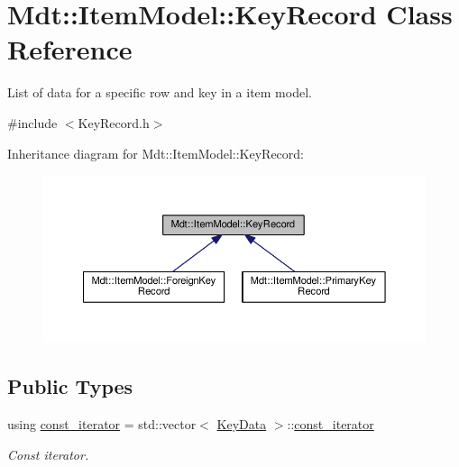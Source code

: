\hypertarget{class_mdt_1_1_item_model_1_1_key_record}{}\section{Mdt\+:\+:Item\+Model\+:\+:Key\+Record Class Reference}
\label{class_mdt_1_1_item_model_1_1_key_record}


List of data for a specific row and key in a item model.  




{\ttfamily \#include $<$Key\+Record.\+h$>$}



Inheritance diagram for Mdt\+:\+:Item\+Model\+:\+:Key\+Record\+:\nopagebreak
\begin{figure}[H]
\begin{center}
\leavevmode
\includegraphics[width=350pt]{class_mdt_1_1_item_model_1_1_key_record__inherit__graph}
\end{center}
\end{figure}
\subsection*{Public Types}
\begin{DoxyCompactItemize}
\item 
using \hyperlink{class_mdt_1_1_item_model_1_1_key_record_af1d11bf9db822ef3c493c9ad89677289}{const\+\_\+iterator} = std\+::vector$<$ \hyperlink{class_mdt_1_1_item_model_1_1_key_data}{Key\+Data} $>$\+::\hyperlink{class_mdt_1_1_item_model_1_1_key_record_af1d11bf9db822ef3c493c9ad89677289}{const\+\_\+iterator}\hypertarget{class_mdt_1_1_item_model_1_1_key_record_af1d11bf9db822ef3c493c9ad89677289}{}\label{class_mdt_1_1_item_model_1_1_key_record_af1d11bf9db822ef3c493c9ad89677289}

\begin{DoxyCompactList}\small\item\em Const iterator. \end{DoxyCompactList}\end{DoxyCompactItemize}
